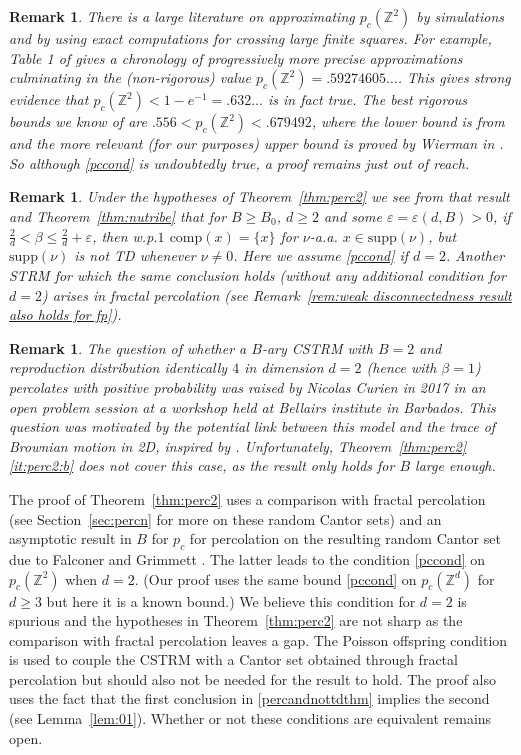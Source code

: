 \documentclass[12pt]{article}
\numberwithin{theorem}{section}
\newtheorem{remark}[theorem]{Remark}
\theoremstyle{def}
\numberwithin{equation}{section}
\newcommand{\Z}{\mathbb{Z}}
\newcommand{\veps}{\varepsilon}
\newcommand{\supp}{\mathrm{supp}}
\begin{document}
\begin{remark}\label{rem:perclit}
There is a large literature on approximating $p_c(\Z^2)$ by simulations and by using exact computations for crossing large finite squares. 
For example, Table 1 of \cite{M22}  gives a chronology of progressively more precise  approximations culminating in the (non-rigorous) value $p_c(\Z^2)=.59274605\dots$.  
This gives strong evidence that $p_c(\Z^2)<1-e^{-1}=.632\dots$ is in fact true.  
The best rigorous bounds we know of are $.556<p_c(\Z^2)<.679492$, where the lower bound is from \cite{BE96} and the more relevant (for our purposes) upper bound is proved by Wierman in \cite{W95}.  
So although \eqref{pccond} is undoubtedly true, a proof remains just out of reach. \end{remark}
\begin{remark}\label{rem:ccomp}
Under the hypotheses of Theorem~\ref{thm:perc2} we see from that result and Theorem~\ref{thm:nutribe} that for $B\ge B_0$, $d\ge 2$ and some $\veps=\veps(d,B)>0$, if $\frac{2}{d}<\beta\le \frac{2}{d}+\veps$, then w.p.$1$ $\text{comp}(x)=\{x\}$ for $\nu$-a.a. $x\in\supp(\nu)$, but $\supp(\nu)$ is not TD whenever $\nu\neq 0$. Here we assume \eqref{pccond} if $d=2$. Another STRM for which the same conclusion holds (without any additional condition for $d=2$) arises in fractal percolation (see Remark~\ref{rem:weak disconnectedness result also holds for fp}).
\end{remark}
\begin{remark}
The question of whether a $B$-ary CSTRM with $B=2$ and reproduction distribution identically $4$ in dimension $d=2$ (hence with $\beta=1$) percolates with positive probability was raised by Nicolas Curien in 2017 in an open problem session at a workshop held at Bellairs institute in Barbados. 
This question was motivated by the potential link between this model and the trace of Brownian motion in 2D, inspired by \cite{Per96}. 
Unfortunately, Theorem~\ref{thm:perc2}\ref{it:perc2:b} does not cover this case, as the result only holds for $B$ large enough.
\end{remark}
The proof of Theorem~\ref{thm:perc2} uses a comparison with fractal percolation (see Section~\ref{sec:percn} for more on these random Cantor sets) and an asymptotic result in $B$ for $p_c$ for percolation on the resulting random Cantor set due to Falconer and Grimmett \cite{FG92}. 
The latter leads to the condition \eqref{pccond} on $p_c(\Z^2)$ when $d=2$. 
(Our proof uses the same bound \eqref{pccond} on $p_c(\Z^d)$ for $d\ge 3$  but here it is a known bound.)
We believe this condition for $d=2$ is spurious and the hypotheses in Theorem~\ref{thm:perc2} are not sharp as the comparison with fractal percolation leaves a gap. 
The Poisson offspring condition is used to couple the CSTRM with a Cantor set obtained through fractal percolation but should also not be needed for the result to hold. 
The proof also uses the fact that the first conclusion in \eqref{percandnottdthm} implies the second (see Lemma~\ref{lem:01}).
 Whether or not these conditions are equivalent remains open.
\end{document}
